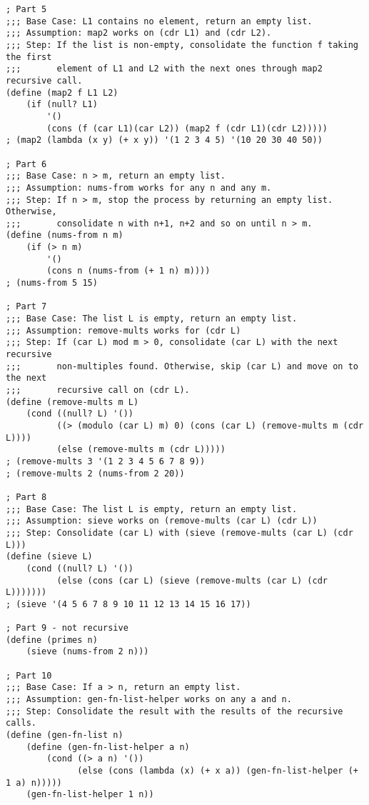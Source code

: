 \documentclass[10pt]{article}
\begin{document}
\begin{verbatim}
; Part 5
;;; Base Case: L1 contains no element, return an empty list.
;;; Assumption: map2 works on (cdr L1) and (cdr L2).
;;; Step: If the list is non-empty, consolidate the function f taking the first 
;;;       element of L1 and L2 with the next ones through map2 recursive call.
(define (map2 f L1 L2)
    (if (null? L1)
        '()
        (cons (f (car L1)(car L2)) (map2 f (cdr L1)(cdr L2)))))
; (map2 (lambda (x y) (+ x y)) '(1 2 3 4 5) '(10 20 30 40 50))

; Part 6
;;; Base Case: n > m, return an empty list.
;;; Assumption: nums-from works for any n and any m.
;;; Step: If n > m, stop the process by returning an empty list. Otherwise, 
;;;       consolidate n with n+1, n+2 and so on until n > m.
(define (nums-from n m)
    (if (> n m)
        '()
        (cons n (nums-from (+ 1 n) m))))
; (nums-from 5 15)

; Part 7
;;; Base Case: The list L is empty, return an empty list.
;;; Assumption: remove-mults works for (cdr L)
;;; Step: If (car L) mod m > 0, consolidate (car L) with the next recursive 
;;;       non-multiples found. Otherwise, skip (car L) and move on to the next 
;;;       recursive call on (cdr L).
(define (remove-mults m L)
    (cond ((null? L) '())
          ((> (modulo (car L) m) 0) (cons (car L) (remove-mults m (cdr L))))
          (else (remove-mults m (cdr L)))))
; (remove-mults 3 '(1 2 3 4 5 6 7 8 9))
; (remove-mults 2 (nums-from 2 20))

; Part 8
;;; Base Case: The list L is empty, return an empty list.
;;; Assumption: sieve works on (remove-mults (car L) (cdr L))
;;; Step: Consolidate (car L) with (sieve (remove-mults (car L) (cdr L)))
(define (sieve L)
    (cond ((null? L) '())
          (else (cons (car L) (sieve (remove-mults (car L) (cdr L)))))))
; (sieve '(4 5 6 7 8 9 10 11 12 13 14 15 16 17))
 
; Part 9 - not recursive
(define (primes n)
    (sieve (nums-from 2 n)))
    
; Part 10
;;; Base Case: If a > n, return an empty list.
;;; Assumption: gen-fn-list-helper works on any a and n.
;;; Step: Consolidate the result with the results of the recursive calls.
(define (gen-fn-list n)
    (define (gen-fn-list-helper a n)
        (cond ((> a n) '())
              (else (cons (lambda (x) (+ x a)) (gen-fn-list-helper (+ 1 a) n)))))
    (gen-fn-list-helper 1 n))
\end{verbatim}
\end{document}
